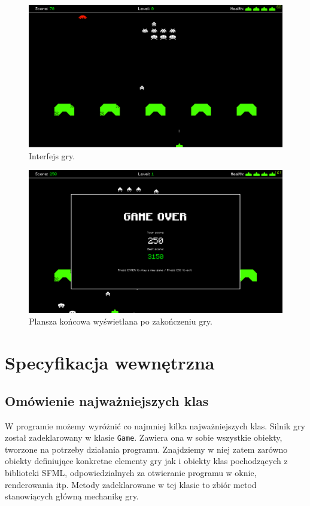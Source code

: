 \documentclass[12pt,a4paper]{article}
\begin{document}
\begin{figure}[h]
\centering
\includegraphics[width=11.8cm]{interface}
\caption{ \centering Interfejs gry.}
\label{fig:interface}
\end{figure}

\clearpage

\begin{figure}[h]
\centering
\includegraphics[width=11.8cm]{end}
\caption{ \centering Plansza końcowa wyświetlana po zakończeniu gry.}
\label{fig:end}
\end{figure}


\section{Specyfikacja wewnętrzna}\label{sec:sp-wew}

\subsection{Omówienie najważniejszych klas}
W programie możemy wyróżnić co najmniej kilka najważniejszych klas. Silnik gry został zadeklarowany w klasie \lstinline|Game|. Zawiera ona w sobie wszystkie obiekty, tworzone na potrzeby działania programu. Znajdziemy w niej zatem zarówno obiekty definiujące konkretne elementy gry jak i obiekty klas pochodzących z biblioteki SFML, odpowiedzialnych za otwieranie programu w oknie, renderowania itp. Metody zadeklarowane w tej klasie to zbiór metod stanowiących główną mechanikę gry. 
\end{document}

